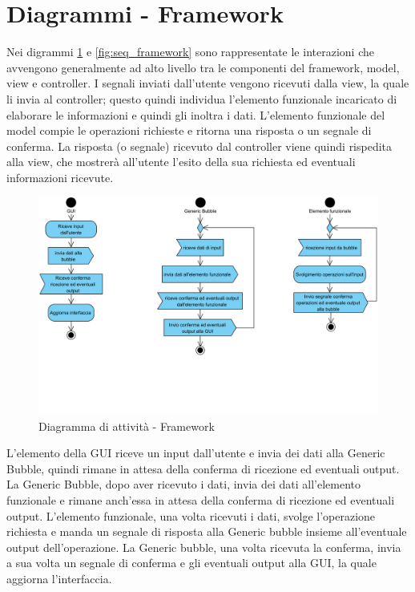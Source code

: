 \section{Diagrammi - Framework}\label{DiagrammiFramework}

Nei digrammi \ref{fig:alt_framework} e \ref{fig:seq_framework} sono rappresentate le interazioni che avvengono generalmente ad alto
livello tra le componenti del framework, model, view e controller. I segnali inviati dall’utente
vengono ricevuti dalla view, la quale li invia al controller; questo quindi individua l’elemento
funzionale incaricato di elaborare le informazioni e quindi gli inoltra i dati. L’elemento funzionale
del model compie le operazioni richieste e ritorna una risposta o un segnale di conferma. La risposta (o segnale) ricevuto dal controller viene quindi rispedita alla view, che mostrerà all’utente l’esito della sua richiesta ed eventuali informazioni ricevute.

\begin{figure}[H]
	\centering
	\includegraphics[width=14cm]{diagrammi_img/attivita/framework.png}
	\caption{Diagramma di attività - Framework}
	\label{fig:alt_framework}
\end{figure}
L'elemento della GUI riceve un input dall'utente e invia dei dati alla Generic Bubble, quindi rimane in attesa della conferma di ricezione ed eventuali output. La Generic Bubble, dopo aver ricevuto i dati, invia dei dati all'elemento funzionale e rimane anch'essa in attesa della conferma di ricezione ed eventuali output. L'elemento funzionale, una volta ricevuti i dati, svolge l'operazione richiesta e manda un segnale di risposta alla Generic bubble insieme all'eventuale output dell'operazione. La Generic bubble, una volta ricevuta la conferma, invia a sua volta un segnale di conferma e gli eventuali output alla GUI, la quale aggiorna l'interfaccia.

